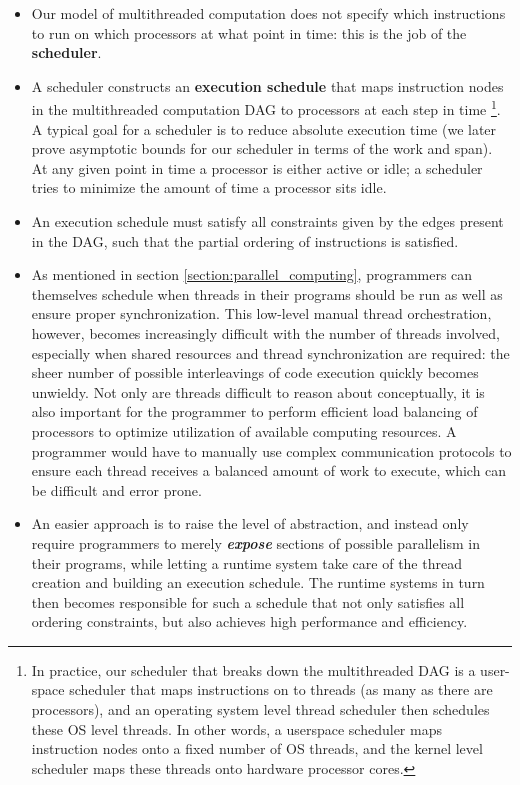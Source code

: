 \documentclass[bsc,frontabs,singlespacing,parskip,deptreport,normalheadings]{infthesis}
\begin{document}
\begin{itemize}
    \item Our model of multithreaded computation does not specify which
        instructions to run on which processors at what point in time: this is
        the job of the \textbf{scheduler}.
    \item A scheduler constructs an \textbf{execution schedule} that maps
        instruction nodes in the multithreaded computation DAG to processors at
        each step in time \footnote{In practice, our scheduler that breaks down
            the multithreaded DAG is a user-space scheduler that maps
            instructions on to threads (as many as there are processors), and an
            operating system level thread scheduler then schedules these OS
            level threads. In other words, a userspace scheduler maps
        instruction nodes onto a fixed number of OS threads, and the kernel
    level scheduler maps these threads onto hardware processor cores.}. A
    typical goal for a scheduler is to reduce absolute execution time (we later
    prove asymptotic bounds for our scheduler in terms of the work and span). At
    any given point in time a processor is either active or idle; a scheduler
    tries to minimize the amount of time a processor sits idle.
    \item An execution schedule must satisfy all constraints given
    by the edges
        present in the DAG, such that the partial ordering of instructions is
        satisfied.
    \item As mentioned in section \ref{section:parallel_computing}, programmers
        can themselves schedule when threads in their programs should be run as
        well as ensure proper synchronization. This low-level manual thread
        orchestration, however, becomes increasingly difficult with the number
        of threads involved, especially when shared resources and thread
        synchronization are required: the sheer number of possible interleavings
        of code execution quickly becomes unwieldy. Not only are threads
        difficult to reason about conceptually, it is also important for the
        programmer to perform efficient load balancing of processors to optimize
        utilization of available computing resources. A programmer would have to
        manually use complex communication protocols to ensure each thread
        receives a balanced amount of work to execute, which can be difficult
        and error prone.
    \item An easier approach is to raise the level of abstraction, and instead
        only require programmers to merely \textit{\textbf{expose}} sections of possible
        parallelism in their programs, while letting a runtime system take care
        of the thread creation and building an execution schedule. The runtime
        systems in turn then becomes responsible for such a schedule that not
        only satisfies all ordering constraints, but also achieves high
        performance and efficiency.
\end{itemize}
\end{document}

